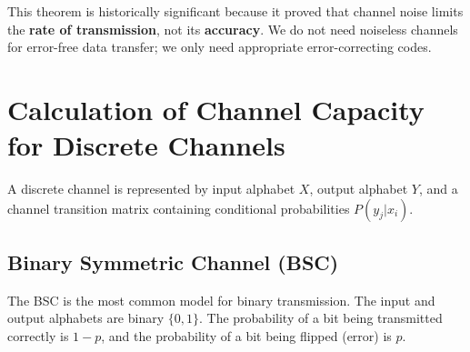 \documentclass[12pt,a4paper]{article}
\begin{document}
This theorem is historically significant because it proved that channel noise limits the \textbf{rate of transmission}, not its \textbf{accuracy}. We do not need noiseless channels for error-free data transfer; we only need appropriate error-correcting codes.

\section{Calculation of Channel Capacity for Discrete Channels}

A discrete channel is represented by input alphabet $X$, output alphabet $Y$, and a channel transition matrix containing conditional probabilities $P(y_j|x_i)$.

\subsection{Binary Symmetric Channel (BSC)}
The BSC is the most common model for binary transmission. The input and output alphabets are binary $\{0, 1\}$. The probability of a bit being transmitted correctly is $1-p$, and the probability of a bit being flipped (error) is $p$.

\begin{tcolorbox}[tikzbox, title={Binary Symmetric Channel (BSC) Transition Model}]
\centering
{}
\end{tcolorbox}
\end{document}
